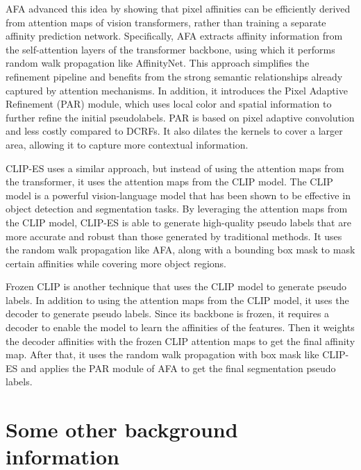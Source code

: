 AFA \cite{wsss_afa_affinity_from_attention} advanced this idea by showing that pixel affinities can be efficiently derived from attention maps of vision transformers, rather than training a separate affinity prediction network. Specifically, AFA extracts affinity information from the self-attention layers of the transformer backbone, using which it performs random walk propagation like AffinityNet. This approach simplifies the refinement pipeline and benefits from the strong semantic relationships already captured by attention mechanisms. In addition, it introduces the Pixel Adaptive Refinement (PAR) module, which uses local color and spatial information to further refine the initial pseudolabels. PAR is based on pixel adaptive convolution and less costly compared to DCRFs. It also dilates the kernels to cover a larger area, allowing it to capture more contextual information.

CLIP-ES \cite{wsss_clip_es} uses a similar approach, but instead of using the attention maps from the transformer, it uses the attention maps from the CLIP model. The CLIP model is a powerful vision-language model that has been shown to be effective in object detection and segmentation tasks. By leveraging the attention maps from the CLIP model, CLIP-ES is able to generate high-quality pseudo labels that are more accurate and robust than those generated by traditional methods. It uses the random walk propagation like AFA, along with a bounding box mask to mask certain affinities while covering more object regions.

Frozen CLIP \cite{wsss_frozen_clip} is another technique that uses the CLIP model to generate pseudo labels. In addition to using the attention maps from the CLIP model, it uses the decoder to generate pseudo labels. Since its backbone is frozen, it requires a decoder to enable the model to learn the affinities of the features. Then it weights the decoder affinities with the frozen CLIP attention maps to get the final affinity map. After that, it uses the random walk propagation with box mask like CLIP-ES and applies the PAR module of AFA to get the final segmentation pseudo labels.

\section{Some other background information}
\label{subsec:some-other-background-information}

